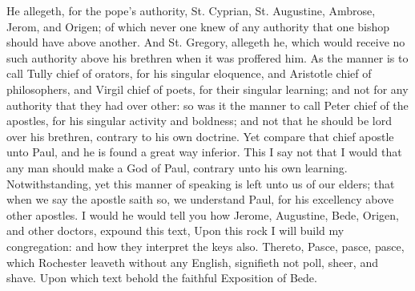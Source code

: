 He allegeth, for the pope's authority, St. Cyprian, 
St. Augustine, Ambrose, Jerom, and Origen; of which 
never one knew of any authority that one bishop should 
have above another. And St. Gregory, allegeth he, which 
would receive no such authority above his brethren when it 
was proffered him. As the manner is to call Tully chief 
of orators, for his singular eloquence, and Aristotle chief 
of philosophers, and Virgil chief of poets, for their singular
learning; and not for any authority that they had 
over other: so was it the manner to call Peter chief of the 
apostles, for his singular activity and boldness; and not 
that he should be lord over his brethren, contrary to his 
own doctrine. Yet compare that chief apostle unto Paul, 
and he is found a great way inferior. This I say not that 
I would that any man should make a God of Paul, contrary
unto his own learning. Notwithstanding, yet this 
manner of speaking is left unto us of our elders; that 
when we say the apostle saith so, we understand Paul, for 
his excellency above other apostles. I would he would 
tell you how Jerome, Augustine, Bede, Origen, and other 
doctors, expound this text, Upon this rock I will build my 
congregation: and how they interpret the keys also. 
Thereto, Pasce, pasce, pasce, which Rochester leaveth 
without any English, signifieth not poll, sheer, and shave. 
Upon which text behold the faithful Exposition of Bede. 

